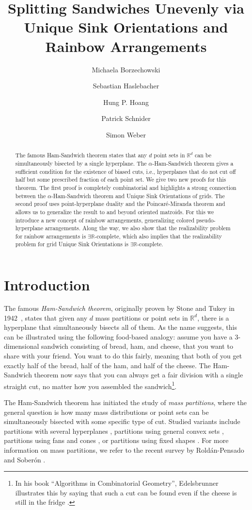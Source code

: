 \documentclass[a4paper,UKenglish,cleveref, autoref, thm-restate, nolineno]{socg-lipics-v2021}
\title{Splitting Sandwiches Unevenly via Unique Sink Orientations and Rainbow Arrangements  }
\author{Michaela Borzechowski}{Department of Mathematics and Computer Science, Freie Universität Berlin, Germany}{michaela.borzechowski@fu-berlin.de}{}{DFG within GRK~2434 \emph{Facets of Complexity}.}
\author{Sebastian Haslebacher}{Department of Computer Science, ETH Zürich, Switzerland}{sebastian.haslebacher@inf.ethz.ch}{https://orcid.org/0000-0003-3988-3325}{}
\author{Hung P. Hoang}{Algorithms and Complexity Group, Faculty of Informatics, TU Wien, Austria}{phoang@ac.tuwien.ac.at}{https://orcid.org/0000-0001-7883-4134}{Austrian Science Foundation (FWF, projects 10.55776/Y1329 and ESP1136425)}
\author{Patrick Schnider}{Department of Mathematics and Computer Science, University of Basel, Switzerland \\ Department of Computer Science, ETH Zürich, Switzerland}{patrick.schnider@inf.ethz.ch}{https://orcid.org/0000-0002-2172-9285}{}
\author{Simon Weber}{Department of Computer Science, ETH Zürich, Switzerland}{simon.weber@inf.ethz.ch}{https://orcid.org/0000-0003-1901-3621}{}
\newcommand{\R}{\mathbb{R}}
\newcommand{\ER}{\exists\mathbb{R}}
\begin{document}
\maketitle

\begin{abstract}
    The famous Ham-Sandwich theorem states that any $d$ point sets in $\mathbb{R}^d$ can be simultaneously bisected by a single hyperplane. The $\alpha$-Ham-Sandwich theorem gives a sufficient condition for the existence of biased cuts, i.e., hyperplanes that do not cut off half but some prescribed fraction of each point set. We give two new proofs for this theorem. The first proof is completely combinatorial and highlights a strong connection between the $\alpha$-Ham-Sandwich theorem and Unique Sink Orientations of grids. The second proof uses point-hyperplane duality and the Poincar\'{e}-Miranda theorem and allows us to generalize the result to and beyond oriented matroids. For this we introduce a new concept of rainbow arrangements, generalizing colored pseudo-hyperplane arrangements. Along the way, we also show that the realizability problem for rainbow arrangements is $\ER$-complete, which also implies that the realizability problem for grid Unique Sink Orientations is $\ER$-complete.
\end{abstract}

\section{Introduction}
\label{sec:intro}

The famous \emph{Ham-Sandwich theorem}, originally proven by Stone and Tukey in 1942~\cite{StoneTukey}, states that given any $d$ mass partitions or point sets in $\R^d$, there is a hyperplane that simultaneously bisects all of them. As the name suggests, this can be illustrated using the following food-based analogy: assume you have a 3-dimensional sandwich consisting of bread, ham, and cheese, that you want to share with your friend. You want to do this fairly, meaning that both of you get exactly half of the bread, half of the ham, and half of the cheese. The Ham-Sandwich theorem now says that you can always get a fair division with a single straight cut, no matter how you assembled the sandwich\footnote{In his book ``Algorithms in Combinatorial Geometry'', Edelsbrunner illustrates this by saying that such a cut can be found even if the cheese is still in the fridge \cite{EdelsbrunnerBook}.}.

The Ham-Sandwich theorem has initiated the study of \emph{mass partitions}, where the general question is how many mass distributions or point sets can be simultaneously bisected with some specific type of cut. Studied variants include partitions with several hyperplanes \cite{Barba2019,Blagojevic2022,Hubard2020,Hubard2024,Schnider2021}, partitions using general convex sets \cite{Aichholzer:2018gu,Akopyan:2013jt,Blagojevic:2007ij}, partitions using fans and cones \cite{Barany:2002tk,Schnider2019,Soberon2023}, or partitions using fixed shapes \cite{cookie_cutters}. For more information on mass partitions, we refer to the recent survey by Rold\'{a}n-Pensado and Sober\'{o}n \cite{RoldanPensado2022}.
\end{document}
